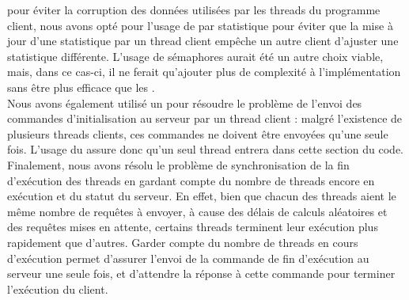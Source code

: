\documentclass[11pt]{article}
\begin{document}
 pour éviter la corruption des données utilisées par les threads du programme client, nous avons opté pour l'usage de  par statistique pour 
 éviter que la mise à jour d'une statistique par un thread client empêche un autre client d'ajuster une statistique différente. L'usage de sémaphores aurait 
 été un autre choix viable, mais, dans ce cas-ci, il ne ferait qu'ajouter plus de complexité à l'implémentation sans être plus efficace que les .
\\
Nous avons également utilisé un pour résoudre le problème de l’envoi des commandes d’initialisation au serveur par un thread client : malgré l’existence 
de plusieurs threads clients, ces commandes ne doivent être envoyées qu’une seule fois. L’usage du assure donc qu’un seul thread entrera dans cette section 
du code. 
\\
Finalement, nous avons résolu le problème de synchronisation de la fin d’exécution des threads en gardant compte du nombre de threads encore en exécution et 
du statut du serveur. En effet, bien que chacun des threads aient le même nombre de requêtes à envoyer, à cause des délais de calculs aléatoires et des requêtes 
mises en attente, certains threads terminent leur exécution plus rapidement que d’autres. Garder compte du nombre de threads en cours d’exécution permet d’assurer 
l’envoi de la commande de fin d’exécution au serveur une seule fois, et d’attendre la réponse à cette commande pour terminer l’exécution du client. 
\\
\end{document}

